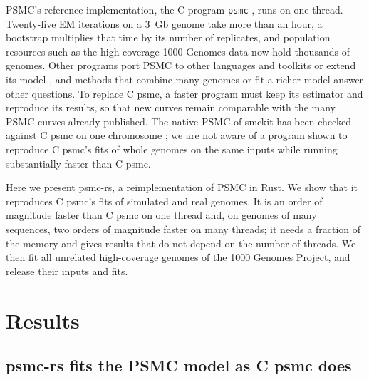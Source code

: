 \documentclass[11pt]{article}
\newcommand{\psmcrs}{psmc-rs}
\begin{document}
PSMC's reference implementation, the C program \texttt{psmc} \citep{psmcC}, runs on one thread. Twenty-five EM iterations on a 3~Gb genome take more than an hour, a bootstrap multiplies that time by its number of replicates, and population resources such as the high-coverage 1000 Genomes data \citep{byrskabishop2022} now hold thousands of genomes. Other programs port PSMC to other languages and toolkits \citep{psmcr,psmcpython,smckit} or extend its model \citep{schiffels2020,liu2022,cousins2024,cousins2025}, and methods that combine many genomes or fit a richer model answer other questions. To replace C psmc, a faster program must keep its estimator and reproduce its results, so that new curves remain comparable with the many PSMC curves already published. The native PSMC of smckit has been checked against C psmc on one chromosome \citep{smckit}; we are not aware of a program shown to reproduce C psmc's fits of whole genomes on the same inputs while running substantially faster than C psmc.

Here we present \psmcrs{}, a reimplementation of PSMC in Rust. We show that it reproduces C psmc's fits of simulated and real genomes. It is an order of magnitude faster than C psmc on one thread and, on genomes of many sequences, two orders of magnitude faster on many threads; it needs a fraction of the memory and gives results that do not depend on the number of threads. We then fit all \EsevenGenomes{} unrelated high-coverage genomes of the 1000 Genomes Project, and release their inputs and fits.

\section*{Results}

\subsection*{\psmcrs{} fits the PSMC model as C psmc does}
\end{document}
